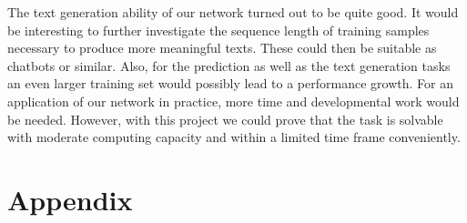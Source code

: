 \documentclass[11pt,a4paper,bibliography=totocnumbered,listof=totocnumbered]{scrartcl}
\begin{document}
The text generation ability of our network turned out to be quite good. It would be interesting to further investigate the sequence length of training samples necessary to produce more meaningful texts. These could then be suitable as chatbots or similar. Also, for the prediction as well as the text generation tasks an even larger training set would possibly lead to a performance growth. For an application of our network in practice, more time and developmental work would be needed. However, with this project we could prove that the task is solvable with moderate computing capacity and within a limited time frame conveniently. 

\pagebreak
\section{Appendix}
\end{document}
